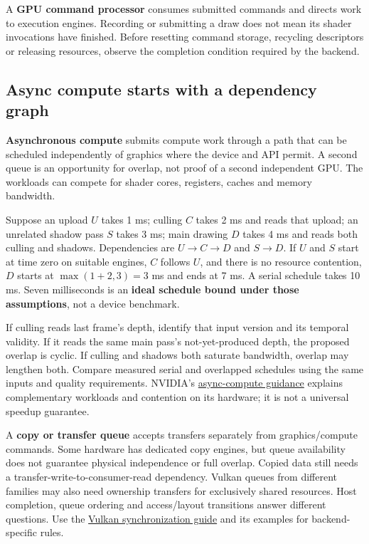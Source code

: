 A \textbf{GPU command processor} consumes submitted commands and directs work to execution engines. Recording or submitting a draw does not mean its shader invocations have finished. Before resetting command storage, recycling descriptors or releasing resources, observe the completion condition required by the backend.

\subsection{Async compute starts with a dependency graph}\label{03-visual-computing-i-ch016-async-compute-starts-with-a-dependency-graph}

\textbf{Asynchronous compute} submits compute work through a path that can be scheduled independently of graphics where the device and API permit. A second queue is an opportunity for overlap, not proof of a second independent GPU. The workloads can compete for shader cores, registers, caches and memory bandwidth.

Suppose an upload \(U\) takes 1 ms; culling \(C\) takes 2 ms and reads that upload; an unrelated shadow pass \(S\) takes 3 ms; main drawing \(D\) takes 4 ms and reads both culling and shadows. Dependencies are \(U\to C\to D\) and \(S\to D\). If \(U\) and \(S\) start at time zero on suitable engines, \(C\) follows \(U\), and there is no resource contention, \(D\) starts at \(\max(1+2,3)=3\) ms and ends at 7 ms. A serial schedule takes 10 ms. Seven milliseconds is an \textbf{ideal schedule bound under those assumptions}, not a device benchmark.

If culling reads last frame's depth, identify that input version and its temporal validity. If it reads the same main pass's not-yet-produced depth, the proposed overlap is cyclic. If culling and shadows both saturate bandwidth, overlap may lengthen both. Compare measured serial and overlapped schedules using the same inputs and quality requirements. NVIDIA's \href{https://developer.nvidia.com/blog/advanced-api-performance-async-compute-and-overlap/}{async-compute guidance} explains complementary workloads and contention on its hardware; it is not a universal speedup guarantee.

A \textbf{copy or transfer queue} accepts transfers separately from graphics/compute commands. Some hardware has dedicated copy engines, but queue availability does not guarantee physical independence or full overlap. Copied data still needs a transfer-write-to-consumer-read dependency. Vulkan queues from different families may also need ownership transfers for exclusively shared resources. Host completion, queue ordering and access/layout transitions answer different questions. Use the \href{https://docs.vulkan.org/guide/latest/synchronization.html}{Vulkan synchronization guide} and its examples for backend-specific rules.


